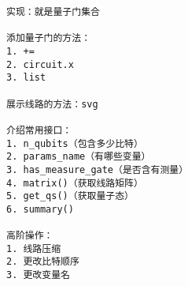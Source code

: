 \begin{lstlisting}
实现：就是量子门集合

添加量子门的方法：
1. +=
2. circuit.x
3. list

展示线路的方法：svg

介绍常用接口：
1. n_qubits（包含多少比特）
2. params_name（有哪些变量）
3. has_measure_gate（是否含有测量）
4. matrix()（获取线路矩阵）
5. get_qs()（获取量子态）
6. summary()

高阶操作：
1. 线路压缩
2. 更改比特顺序
3. 更改变量名
\end{lstlisting}